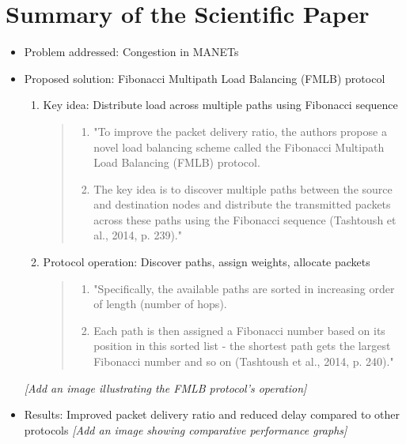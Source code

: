 \documentclass{article}
\begin{document}
\section{Summary of the Scientific Paper}
\begin{itemize}
    \item Problem addressed: Congestion in MANETs
    \item Proposed solution: Fibonacci Multipath Load Balancing (FMLB) protocol
    \begin{enumerate}
        \item Key idea: Distribute load across multiple paths using Fibonacci sequence
        \begin{quote}
            \begin{enumerate}[label=(\arabic*)]
                \item "To improve the packet delivery ratio, the authors propose a novel load balancing scheme called the 
                      Fibonacci Multipath Load Balancing (FMLB) protocol.
                \item The key idea is to discover multiple paths between the source and destination nodes and distribute the 
                      transmitted packets across these paths using the Fibonacci sequence (Tashtoush et al., 2014, p. 239)."
            \end{enumerate}
        \end{quote}
        \item Protocol operation: Discover paths, assign weights, allocate packets
        \begin{quote}
            \begin{enumerate}[label=(\arabic*)]
                \item "Specifically, the available paths are sorted in increasing order of length (number of hops).
                \item Each path is then assigned a Fibonacci number based on its position in this sorted list - the shortest 
                      path gets the largest Fibonacci number and so on (Tashtoush et al., 2014, p. 240)."
            \end{enumerate}
        \end{quote}
    \end{enumerate}
    \textit{[Add an image illustrating the FMLB protocol's operation]}
    \item Results: Improved packet delivery ratio and reduced delay compared to other protocols
    \textit{[Add an image showing comparative performance graphs]}

\end{itemize}
\end{document}
